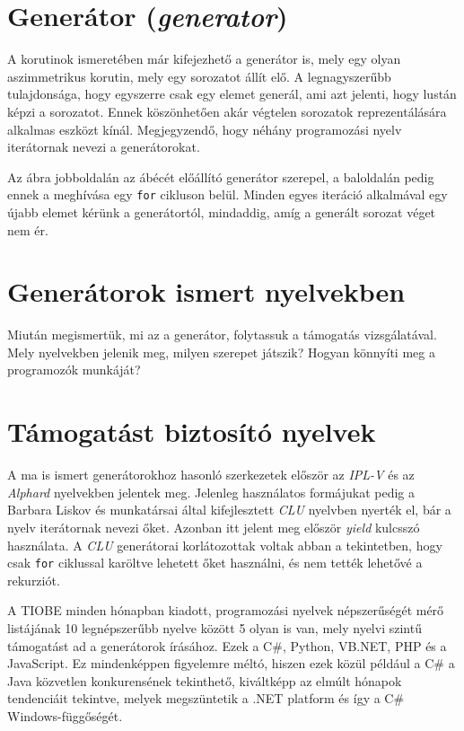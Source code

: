 \documentclass[12pt, a4paper]{article}
\begin{document}
\section{Generátor (\textit{generator})}

A korutinok ismeretében már kifejezhető a generátor is, mely egy olyan aszimmetrikus korutin, mely egy sorozatot állít elő. A legnagyszerűbb tulajdonsága, hogy egyszerre csak egy elemet generál, ami azt jelenti, hogy lustán képzi a sorozatot. Ennek köszönhetően akár végtelen sorozatok reprezentálására alkalmas eszközt kínál. Megjegyzendő, hogy néhány programozási nyelv iterátornak nevezi a generátorokat.

Az ábra jobboldalán az ábécét előállító generátor szerepel, a baloldalán pedig ennek a meghívása egy \texttt{for} cikluson belül. Minden egyes iteráció alkalmával egy újabb elemet kérünk a generátortól, mindaddig, amíg a generált sorozat véget nem ér.

\section{Generátorok ismert nyelvekben}

Miután megismertük, mi az a generátor, folytassuk a támogatás vizsgálatával. Mely nyelvekben jelenik meg, milyen szerepet játszik? Hogyan könnyíti meg a programozók munkáját?

\section{Támogatást biztosító nyelvek}

A ma is ismert generátorokhoz hasonló szerkezetek először az \textit{IPL-V} és az \textit{Alphard} nyelvekben jelentek meg. Jelenleg használatos formájukat pedig a Barbara Liskov és munkatársai által kifejlesztett \textit{CLU} nyelvben nyerték el, bár a nyelv iterátornak nevezi őket. Azonban itt jelent meg először \textit{yield} kulcsszó használata. A \textit{CLU} generátorai korlátozottak voltak abban a tekintetben, hogy csak \texttt{for} ciklussal karöltve lehetett őket használni, és nem tették lehetővé a rekurziót.

A TIOBE minden hónapban kiadott, programozási nyelvek népszerűségét mérő listájának 10 legnépszerűbb nyelve között 5 olyan is van, mely nyelvi szintű támogatást ad a generátorok írásához. Ezek a C\#, Python, VB.NET, PHP és a JavaScript. Ez mindenképpen figyelemre méltó, hiszen ezek közül például a C\# a Java közvetlen konkurensének tekinthető, kiváltképp az elmúlt hónapok tendenciáit tekintve, melyek megszüntetik a .NET platform és így a C\# Windows-függőségét.
\end{document}
